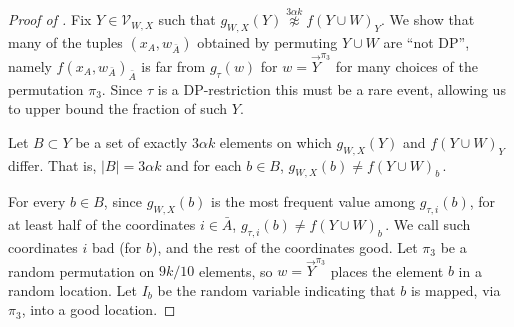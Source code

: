\documentclass{toc}
\newcommand{\abs}[1]{\lvert#1\rvert} %
\newcommand\setf{f} %
\newcommand{\g}{g} %
\newcommand\neqg[1]{\stackrel{{#1}}{ \not\approx}} %
\newcommand\cons{\mathcal{V}} %
\newcommand\rest[1]{{\bar{#1}}}  %
\begin{document}
\begin{proof}[Proof of ]
	
	Fix $Y\in \cons_{W,X}$ such that $\g_{W,X}(Y)\neqg{3\alpha k} \setf(Y\cup W)_Y$. We show that many of the tuples $(x_A,w_{\rest A})$ obtained by permuting $Y\cup W$ are ``not DP'', namely $f(x_A,w_{\rest A})_{\rest A}$ is far from $g_\tau(w)$ for $w=\vec Y^{\pi_3}$ for many choices of the permutation $\pi_3$. Since $\tau$ is a DP-restriction this must be a rare event, allowing us to upper bound the fraction of such $Y$.
	
	
	Let $B\subset Y$ be a set of exactly $3\alpha k$ elements on which $\g_{W,X}(Y)$ and $\setf(Y\cup W)_Y$ differ. That is, $\abs{B} = 3\alpha k$ and for each $b\in B$, $g_{W,X}(b)\neq\setf(Y\cup W)_b$\,.
	
	For every $b\in B$, since $\g_{W,X}(b)$ is the most frequent value among $\g_{\tau,i}(b)$, for at least half of the coordinates $i\in\rest{A}$, $\g_{\tau,i}(b)\neq \setf(Y\cup W)_b$\,. We call such coordinates $i$ bad (for $b$), and the rest of the coordinates good. %
	Let $\pi_3$ be a random permutation on $9k/10$ elements, so $w=\vec Y^{\pi_3}$ places the element $b$ in a random location. Let $I_b$ be
%
the  %
random variable indicating that $b$ is mapped, via $\pi_3$, into a good location.
	

\end{proof}
\end{document}
